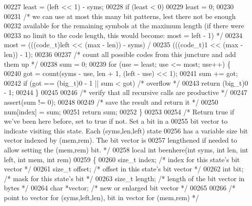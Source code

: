 \begin{DoxyCode}
00227     least = (left << 1) - syms;
00228     \textcolor{keywordflow}{if} (least < 0)
00229         least = 0;
00230 
00231     \textcolor{comment}{/* we can use at most this many bit patterns, lest there not be enough}
00232 \textcolor{comment}{       available for the remaining symbols at the maximum length (if there were}
00233 \textcolor{comment}{       no limit to the code length, this would become: most = left - 1) */}
00234     most = (((code\_t)left << (max - len)) - syms) /
00235             (((code\_t)1 << (max - len)) - 1);
00236 
00237     \textcolor{comment}{/* count all possible codes from this juncture and add them up */}
00238     sum = 0;
00239     \textcolor{keywordflow}{for} (use = least; use <= most; use++) \{
00240         got = count(syms - use, len + 1, (left - use) << 1);
00241         sum += got;
00242         \textcolor{keywordflow}{if} (got == (big\_t)0 - 1 || sum < got)   \textcolor{comment}{/* overflow */}
00243             \textcolor{keywordflow}{return} (big\_t)0 - 1;
00244     \}
00245 
00246     \textcolor{comment}{/* verify that all recursive calls are productive */}
00247     assert(sum != 0);
00248 
00249     \textcolor{comment}{/* save the result and return it */}
00250     num[index] = sum;
00251     \textcolor{keywordflow}{return} sum;
00252 \}
00253 
00254 \textcolor{comment}{/* Return true if we've been here before, set to true if not.  Set a bit in a}
00255 \textcolor{comment}{   bit vector to indicate visiting this state.  Each (syms,len,left) state}
00256 \textcolor{comment}{   has a variable size bit vector indexed by (mem,rem).  The bit vector is}
00257 \textcolor{comment}{   lengthened if needed to allow setting the (mem,rem) bit. */}
00258 local \textcolor{keywordtype}{int} beenhere(\textcolor{keywordtype}{int} syms, \textcolor{keywordtype}{int} len, \textcolor{keywordtype}{int} left, \textcolor{keywordtype}{int} mem, \textcolor{keywordtype}{int} rem)
00259 \{
00260     \textcolor{keywordtype}{size\_t} index;       \textcolor{comment}{/* index for this state's bit vector */}
00261     \textcolor{keywordtype}{size\_t} offset;      \textcolor{comment}{/* offset in this state's bit vector */}
00262     \textcolor{keywordtype}{int} bit;            \textcolor{comment}{/* mask for this state's bit */}
00263     \textcolor{keywordtype}{size\_t} length;      \textcolor{comment}{/* length of the bit vector in bytes */}
00264     \textcolor{keywordtype}{char} *vector;       \textcolor{comment}{/* new or enlarged bit vector */}
00265 
00266     \textcolor{comment}{/* point to vector for (syms,left,len), bit in vector for (mem,rem) */}

\end{DoxyCode}
